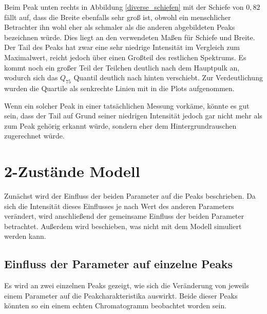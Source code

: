 Beim Peak unten rechts in Abbildung \ref{diverse_schiefen} mit der Schiefe von $0,82$ fällt auf, dass die Breite ebenfalls sehr groß ist, obwohl ein menschlicher Betrachter ihn wohl eher als schmaler als die anderen abgebildeten Peaks bezeichnen würde. Dies liegt an den verwendeten Maßen für Schiefe und Breite. Der Tail des Peaks hat zwar eine sehr niedrige Intensität im Vergleich zum Maximalwert, reicht jedoch über einen Großteil des restlichen Spektrums. Es kommt noch ein großer Teil der Teilchen deutlich nach dem Hauptpulk an, wodurch sich das $Q_{75}$ Quantil deutlich nach hinten verschiebt. Zur Verdeutlichung wurden die Quartile als senkrechte Linien mit in die Plots aufgenommen.

Wenn ein solcher Peak in einer tatsächlichen Messung vorkäme, könnte es gut sein, dass der Tail auf Grund seiner niedrigen Intensität jedoch gar nicht mehr als zum Peak gehörig erkannt würde, sondern eher dem Hintergrundrauschen zugerechnet würde.



\section{2-Zustände Modell} 
Zunächst wird der Einfluss der beiden Parameter auf die Peaks beschrieben. Da sich die Intensität dieses Einflusses je nach Wert des anderen Parameters verändert, wird anschließend der gemeinsame Einfluss der beiden Parameter betrachtet. Außerdem wird beschieben, was nicht mit dem Modell simuliert werden kann.

\subsection{Einfluss der Parameter auf einzelne Peaks}

Es wird an zwei einzelnen Peaks gezeigt, wie sich die Veränderung von jeweils einem Parameter auf die Peakcharakteristika auswirkt. Beide dieser Peaks könnten so ein einem echten Chromatogramm beobachtet worden sein.

